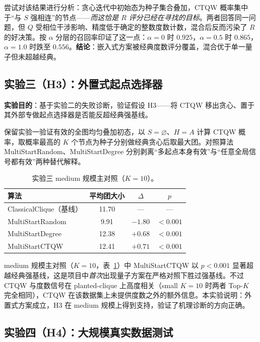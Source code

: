 \documentclass[pre,twocolumn]{revtex4-2}
\begin{document}
尝试对该结果进行分析：贪心迭代中初始态为种子集合叠加，CTQW 概率集中于“与 $S$ 强相连”的节点——\emph{而这恰是 $R$ 评分已经在寻找的目标}。两者回答同一问题，但 $Q$ 受相位干涉影响、精度低于确定的整数度数计数，混合后反而污染了 $R$ 的好决策。按 $\alpha$ 分层的召回率印证了这一点：$\alpha=0$ 时 $0.925$，$\alpha=0.5$ 时 $0.865$，$\alpha=1.0$ 时跌至 $0.556$。\textbf{结论}：嵌入式方案被经典度数评分覆盖，混合优于单一量子但未超越经典。

\subsection{实验三（H3）：外置式起点选择器}
\textbf{实验目的}：基于实验二的失败诊断，验证假设 H3——将 CTQW 移出贪心、置于其外部专做起点选择器是否能反超经典强基线。

保留实验一验证有效的全图均匀叠加初态，以 $S=\varnothing$、$H=A$ 计算 CTQW 概率，取概率最高的 $K$ 个节点为种子分别做经典贪心后取最大团。对照算法 MultiStartRandom、MultiStartDegree 分别剥离“多起点本身有效”与“任意全局信号都有效”两种替代解释。

\begin{table}[H]
\caption{实验三 medium 规模主对照（$K=10$）。}
\label{tbl:exp3}
\centering
\begin{tabular}{lccc}
\hline\hline
算法 & 平均团大小 & $\Delta$ & $p$ \\
\hline
ClassicalClique（基线） & 11.70 & --- & --- \\
MultiStartRandom & 9.91 & $-1.80$ & $<0.001$ \\
MultiStartDegree & 12.38 & $+0.68$ & $<0.001$ \\
MultiStartCTQW & 12.41 & $+0.71$ & $<0.001$ \\
\hline\hline
\end{tabular}
\end{table}

medium 规模主对照（$K{=}10$，表~\ref{tbl:exp3}）中 MultiStartCTQW 以 $p<0.001$ 显著超越经典强基线，这是项目中\emph{首次}出现量子方案在严格对照下胜过强基线。不过 CTQW 与度数信号在 planted-clique 上高度相关（small $K{=}10$ 时两者 Top-$K$ 完全相同），CTQW 在该数据集上未提供度数之外的额外信息。本实验说明：外置式方案成立，H3 在 medium 规模上得到支持，验证了机理诊断的方向正确。

\subsection{实验四（H4）：大规模真实数据测试}
\end{document}
